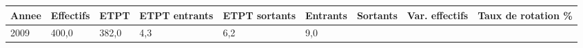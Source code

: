 \begin{longtable}[]{@{}lllllllll@{}}
\toprule
\begin{minipage}[b]{0.05\columnwidth}\raggedright
Annee\strut
\end{minipage} & \begin{minipage}[b]{0.08\columnwidth}\raggedright
Effectifs\strut
\end{minipage} & \begin{minipage}[b]{0.05\columnwidth}\raggedright
ETPT\strut
\end{minipage} & \begin{minipage}[b]{0.10\columnwidth}\raggedright
ETPT entrants\strut
\end{minipage} & \begin{minipage}[b]{0.10\columnwidth}\raggedright
ETPT sortants\strut
\end{minipage} & \begin{minipage}[b]{0.07\columnwidth}\raggedright
Entrants\strut
\end{minipage} & \begin{minipage}[b]{0.07\columnwidth}\raggedright
Sortants\strut
\end{minipage} & \begin{minipage}[b]{0.11\columnwidth}\raggedright
Var. effectifs\strut
\end{minipage} & \begin{minipage}[b]{0.14\columnwidth}\raggedright
Taux de rotation \%\strut
\end{minipage}\tabularnewline
\midrule
\endhead
\begin{minipage}[t]{0.05\columnwidth}\raggedright
2009\strut
\end{minipage} & \begin{minipage}[t]{0.08\columnwidth}\raggedright
400,0\strut
\end{minipage} & \begin{minipage}[t]{0.05\columnwidth}\raggedright
382,0\strut
\end{minipage} & \begin{minipage}[t]{0.10\columnwidth}\raggedright
4,3\strut
\end{minipage} & \begin{minipage}[t]{0.10\columnwidth}\raggedright
6,2\strut
\end{minipage} & \begin{minipage}[t]{0.07\columnwidth}\raggedright
9,0\strut
\end{minipage} & \begin{minipage}[t]{0.07\columnwidth}\raggedright

\end{minipage}
\end{longtable}
